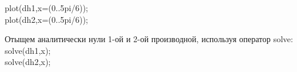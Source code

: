 \documentclass[russian,utf8,nocolumnxxxi,nocolumnxxxii]{eskdtext}
\begin{document}
plot(dh1,x=(0..5pi/6));\\
plot(dh2,x=(0..5pi/6));\\
\begin{figure}[H]
\begin{center}
\begin{minipage}[h]{0.77\linewidth}
\end{minipage}
\end{center}
\end{figure}
\begin{figure}[H]
\begin{center}
\begin{minipage}[h]{0.75\linewidth}
\end{minipage}
\end{center}
\end{figure}
Отыщем аналитически нули 1-ой и 2-ой производной, используя оператор solve:\\
solve(dh1,x);\\
solve(dh2,x);\\
\end{document}
